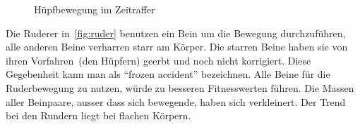 \begin{figure}[H]
        \caption{Hüpfbewegung im Zeitraffer\label{fig:hupf}}

      \end{figure}

      Die Ruderer in~\vref{fig:ruder} benutzen ein Bein um die Bewegung durchzuführen,
      alle anderen Beine verharren starr am Körper.
      Die starren Beine haben sie von ihren Vorfahren~(den Hüpfern) geerbt und noch nicht korrigiert.
      Diese Gegebenheit kann man als ``frozen accident'' bezeichnen.
      Alle Beine für die Ruderbewegung zu nutzen, würde zu besseren Fitnesswerten führen.
      Die Massen aller Beinpaare, ausser dass sich bewegende, haben sich verkleinert.
      Der Trend bei den Rundern liegt bei flachen Körpern.

      \begin{figure}[H]
        \centering


\end{figure}
